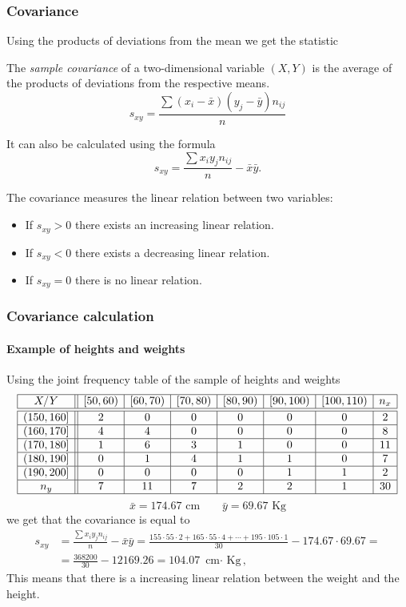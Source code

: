 \begin{frame}
\frametitle{Covariance}
Using the products of deviations from the mean we get the statistic
\begin{definition}
The \emph{sample covariance} of a two-dimensional variable $(X,Y)$ is the average of the products of deviations from
the respective means.
\[
s_{xy}=\frac{\sum (x_i-\bar x)(y_j-\bar y)n_{ij}}{n}
\]
\end{definition}
It can also be calculated using the formula
\[
s_{xy}=\frac{\sum x_iy_jn_{ij}}{n}-\bar x\bar y.
\]

The covariance measures the linear relation between two variables:
\begin{itemize}
\item If $s_{xy}>0$ there exists an increasing linear relation.
\item If $s_{xy}<0$ there exists a decreasing linear relation.
\item If $s_{xy}=0$ there is no linear relation.
\end{itemize}
\end{frame}


\begin{frame}
\frametitle{Covariance calculation}
\framesubtitle{Example of heights and weights}
Using the joint frequency table of the sample of heights and weights
\[
\begin{array}{|c||c|c|c|c|c|c|c|}
\hline
  X/Y & [50,60) & [60,70) & [70,80) & [80,90) & [90,100) & [100,110) & n_x\\
  \hline\hline
  (150,160] & 2 & 0 & 0 & 0 & 0 & 0 & 2\\
  \hline
  (160,170] & 4 & 4 & 0 & 0 & 0 & 0 & 8\\
  \hline
  (170,180] & 1 & 6 & 3 & 1 & 0 & 0 & 11 \\
  \hline
  (180,190] & 0 & 1 & 4 & 1 & 1 & 0 & 7 \\
  \hline
  (190,200] & 0 & 0 & 0 & 0 & 1 & 1 & 2\\
  \hline
  n_y & 7 & 11 & 7 & 2 & 2 & 1 & 30\\
  \hline
\end{array}
\]
\[
\bar x = 174.67 \mbox{ cm} \qquad \bar y = 69.67 \mbox{ Kg}
\]
we get that the covariance is equal to 
\begin{align*}
s_{xy} &=\frac{\sum x_iy_jn_{ij}}{n}-\bar x\bar y =  \frac{155\cdot 55\cdot 2 + 165\cdot 55\cdot 4 + \cdots + 195\cdot 105\cdot 1}{30}-174.67\cdot 69.67 =\\
& = \frac{368200}{30}-12169.26 = 104.07 \mbox{ cm$\cdot$ Kg},
\end{align*}
This means that there is a increasing linear relation between the weight and the height.
\end{frame}


